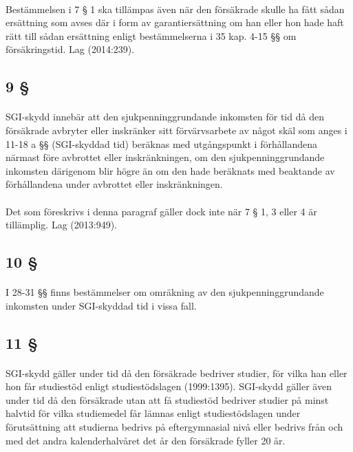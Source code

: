 \documentclass[a4paper,notitlepage,openany,10pt]{book}
\begin{document}
\paragraph*{}
Bestämmelsen i 7 § 1 ska tillämpas även när den försäkrade skulle ha fått sådan ersättning som avses där i form av garantiersättning om han eller hon hade haft rätt till sådan ersättning enligt bestämmelserna i 35 kap. 4-15 §§ om försäkringstid.
Lag (2014:239).
\subsection*{9 §}
\paragraph*{}
SGI-skydd innebär att den sjukpenninggrundande inkomsten för tid då den försäkrade avbryter eller inskränker sitt förvärvsarbete av något skäl som anges i 11-18 a §§ (SGI-skyddad tid) beräknas med utgångspunkt i förhållandena närmast före avbrottet eller inskränkningen, om den sjukpenninggrundande inkomsten därigenom blir högre än om den hade beräknats med beaktande av förhållandena under avbrottet eller inskränkningen.
\paragraph*{}
Det som föreskrivs i denna paragraf gäller dock inte när 7 § 1, 3 eller 4 är tillämplig.
Lag (2013:949).
\subsection*{10 §}
\paragraph*{}
I 28-31 §§ finns bestämmelser om omräkning av den sjukpenninggrundande inkomsten under SGI-skyddad tid i vissa fall.
\subsection*{11 §}
\paragraph*{}
SGI-skydd gäller under tid då den försäkrade bedriver studier, för vilka han eller hon får studiestöd enligt studiestödslagen (1999:1395). SGI-skydd gäller även under tid då den försäkrade utan att få studiestöd bedriver studier på minst halvtid för vilka studiemedel får lämnas enligt studiestödslagen under förutsättning att studierna bedrivs på eftergymnasial nivå eller bedrivs från och med det andra kalenderhalvåret det år den försäkrade fyller 20 år.
\end{document}
